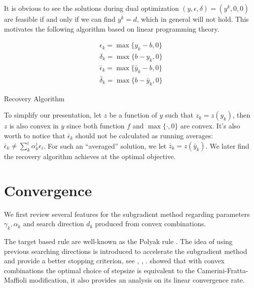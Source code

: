 It is obvious to see the solutions during dual optimization
\((y, \epsilon, \delta) = (y^k, 0, 0)\) are feasible if and only if we
can find \(y^k = d\), which in general will not hold. This motivates the following
algorithm based on linear programming theory.

\begin{algorithm}[H]\label{alg:recovery}
  \SetAlgoLined
  \begin{equation}\label{eq:recovery}
    \begin{aligned}
       & \epsilon_k = \max\{y_k - b, 0\}           \\
       & \delta_k = \max\{b - y_k, 0\}             \\
       & \bar \epsilon_k = \max\{\bar y_k - b, 0\} \\
       & \bar \delta_k = \max\{b - \bar y_k, 0\}
    \end{aligned}\end{equation}
  \caption{Recovery Algorithm}
\end{algorithm}

To simplify our presentation, let
\(z\) be a function of \(y\) such that \(z_k = z(y_k)\), then \(z\) is
also convex in \(y\) since both function \(f\) and \(\max\{\cdot, 0\}\)
are convex. It's also worth to notice that \(\bar \epsilon_k\) should
not be calculated as running averages:
\(\bar \epsilon_k \neq \sum^i_k \alpha^i_k \epsilon_i\). For such an
``averaged'' solution, we let
\(\bar z_k = z(\bar y_k)\). We later find the recovery algorithm achieves
at the optimal objective.


\hypertarget{convergence}{%
  \section{Convergence}\label{convergence}}


We first review several features for the subgradient method regarding
parameters \(\gamma_k, \alpha_k\) and search direction \(d_k\) produced from convex combinations.

The target based rule are well-known as the Polyak rule \cite{polyak_general_1967}.
The idea of using previous searching directions is introduced to accelerate the subgradient method and provide a better stopping criterion,
see \cite{camerini1975improving}, \cite{brannlund1995generalized}, \cite{barahona_volume_2000}.
\cite{brannlund1995generalized} showed that with convex combinations the optimal choice of stepsize is
equivalent to the Camerini-Fratta-Maffioli modification, it also provides an analysis on its linear convergence rate.

